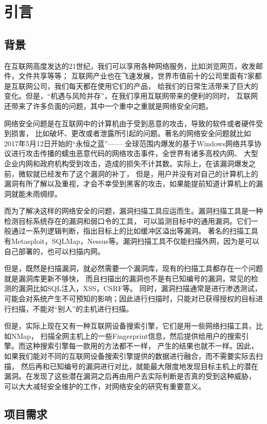 \chapter{引言}
\label{cha:intro}

\section{背景}
在互联网高度发达的21世纪，我们可以享用各种网络服务，比如浏览网页，收发邮件，文件共享等等；
互联网产业也在飞速发展，世界市值前十的公司里面有7家都是互联网公司，我们每天都在使用它们的产品，
给我们的日常生活带来了巨大的变化。但是，“机遇与风险并存”，在我们享用互联网带来的便利的同时，
互联网还带来了许多负面的问题，其中一个重中之重就是网络安全问题。

网络安全问题是在互联网中的计算机由于受到恶意的攻击，导致的软件或者硬件受到损害，
比如破坏、更改或者泄露所引起的问题。著名的网络安全问题就比如2017年5月12日开始的“永恒之蓝”——
全球范围内爆发的基于Windows网络共享协议进行攻击传播的蠕虫恶意代码的网络攻击事件，全世界有诸多高校内网、
大型企业内网和政府机构受到攻击，造成的损失不计其数。实际上，在该漏洞爆发之前，微软就已经发布了这个漏洞的补丁，
但是，用户并没有对自己的计算机上的漏洞有所了解以及重视，才会不幸受到黑客的攻击，如果能提前知道计算机上的漏洞就能未雨绸缪。

而为了解决这样的网络安全的问题，漏洞扫描工具应运而生。漏洞扫描工具是一种检测目标系统存在的漏洞和弱口令的工具，
可以监测目标中的通用漏洞。它们一般通过一系列逻辑判断，指出目标上的比如缓冲区溢出等漏洞。
著名的扫描工具有Metasploit，SQLMap，Nessus等。漏洞扫描工具不仅能扫描外网，因为是可以自己部署的，也可以扫描内网。

但是，既然是扫描漏洞，就必然需要一个漏洞库，现有的扫描工具都存在一个问题就是漏洞库更新不够快，
而且扫描出的漏洞也不是有已知编号的漏洞，常见的检测的漏洞比如SQL注入，XSS，CSRF等。
同时，漏洞扫描通常是进行渗透测试，可能会对系统产生不可预知的影响；因此进行扫描时，只能对已获得授权的目标进行扫描，不能对“别人”的主机进行扫描。

但是，实际上现在又有一种互联网设备搜索引擎，它们是用一些网络扫描工具，比如NMap，
扫描全网主机上的一些Fingerprint信息，然后提供给用户的搜索引擎。而这种搜索引擎每一款用的方法都不一样，
产生的结果也就不一样。因此，如果我们能对不同的互联网设备搜索引擎提供的数据进行融合，而不需要实际去扫描，
然后再和已知编号的漏洞进行对比，就能最大限度地发现目标主机上的潜在漏洞。在发现了这些潜在漏洞之后再由用户去实际判断是否真的受到这种威胁，
可以大大减轻安全维护的工作，对网络安全的研究有重要意义。


\section{项目需求}
\label{sec:requirements}

